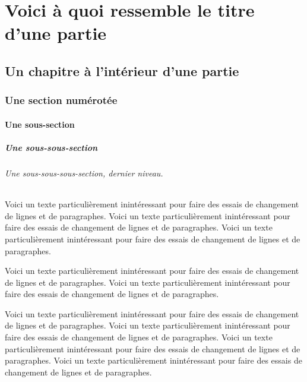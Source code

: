 \documentclass[10pt,frenchb]{book} %
\begin{document}
\part{Voici à quoi ressemble le titre d'une partie}

\chapter{Un chapitre à l'intérieur d'une partie}

\section{Une section numérotée}
\subsection{Une sous-section}
\subsubsection{Une sous-sous-section}
\paragraph{Une sous-sous-sous-section, dernier niveau.}

Voici un texte particulièrement inintéressant pour faire des essais de changement de lignes et de paragraphes. Voici un texte particulièrement inintéressant pour faire des essais de changement de lignes et de paragraphes. Voici un texte particulièrement inintéressant pour faire des essais de changement de lignes et de paragraphes. %

Voici un texte particulièrement inintéressant pour faire des essais de changement de lignes et de paragraphes. Voici un texte particulièrement inintéressant pour faire des essais de changement de lignes et de paragraphes.\par %

Voici un texte particulièrement inintéressant pour faire des essais de changement de lignes et de paragraphes. Voici un texte particulièrement inintéressant pour faire des essais de changement de lignes et de paragraphes. Voici un texte particulièrement inintéressant pour faire des essais de changement de lignes et de paragraphes. Voici un texte particulièrement inintéressant pour faire des essais de changement de lignes et de paragraphes.\par\medskip %
\end{document}
